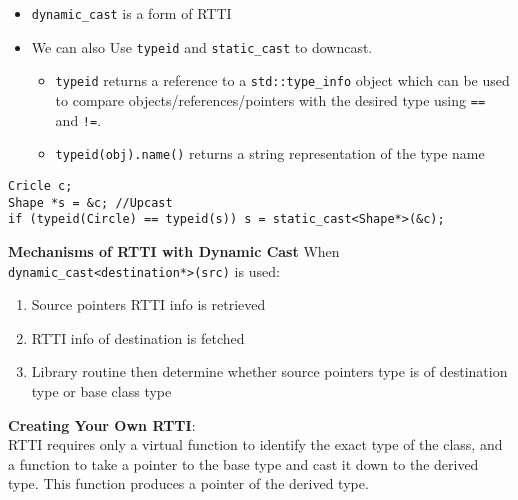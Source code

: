 \documentclass[12pt]{article}
\begin{document}
\begin{itemize}
    \item \lstinline{dynamic_cast} is a form of RTTI
    \item We can also Use \lstinline{typeid} and
    \lstinline{static_cast} to downcast. 
    \begin{itemize}
        \item \lstinline{typeid} returns a reference to a \lstinline{std::type_info} object which can be used to compare objects/references/pointers with the desired type using \lstinline{==} and \lstinline{!=}. 
        \item \lstinline{typeid(obj).name()} returns a string representation of the type name
    \end{itemize}
\end{itemize}
\begin{lstlisting}
Cricle c;
Shape *s = &c; //Upcast
if (typeid(Circle) == typeid(s)) s = static_cast<Shape*>(&c);
\end{lstlisting}
\textbf{Mechanisms of RTTI with Dynamic Cast}
When \lstinline{dynamic_cast<destination*>(src)} is used:
\begin{enumerate}
    \item Source pointers RTTI info is retrieved
    \item RTTI info of destination is fetched
    \item Library routine then determine whether source pointers type is of destination type or base class type
\end{enumerate}

\textbf{Creating Your Own RTTI}: \\
RTTI requires only a virtual function to identify the exact type of the class, and a function to take a pointer to the base type and cast it down to the derived type. This function produces a pointer of the derived type.
\end{document}
